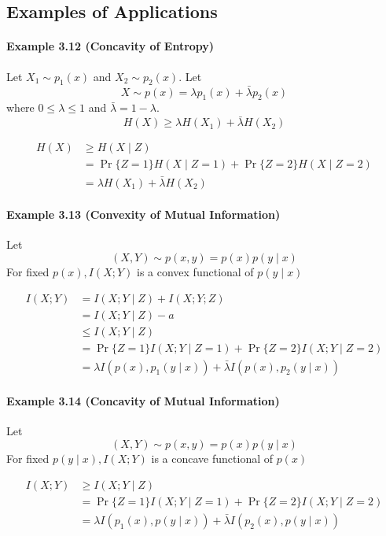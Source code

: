 \documentclass[8pt]{article}
\begin{document}
\subsection{Examples of Applications}
\begin{tcolorbox}
\paragraph{Example 3.12 (Concavity of Entropy)} Let $X_{1} \sim p_{1}(x)$ and $X_{2} \sim p_{2}(x)$. Let
$$
X \sim p(x)=\lambda p_{1}(x)+\bar{\lambda} p_{2}(x)
$$
where $0 \leq \lambda \leq 1$ and $\bar{\lambda}=1-\lambda .$
$$
H(X) \geq \lambda H\left(X_{1}\right)+\bar{\lambda} H\left(X_{2}\right)
$$
\end{tcolorbox}
$$
\begin{aligned}
H(X) & \geq H(X \mid Z) \\
&=\operatorname{Pr}\{Z=1\} H(X \mid Z=1)+\operatorname{Pr}\{Z=2\} H(X \mid Z=2) \\
&=\lambda H\left(X_{1}\right)+\bar{\lambda} H\left(X_{2}\right)
\end{aligned}
$$
\begin{tcolorbox}
\paragraph{Example 3.13 (Convexity of Mutual Information)} Let
$$
(X, Y) \sim p(x, y)=p(x) p(y \mid x)
$$
For fixed $p(x), I(X ; Y)$ is a convex functional of $p(y \mid x)$
\end{tcolorbox}
$$
\begin{aligned}
I(X ; Y) &=I(X ; Y \mid Z)+I(X ; Y ; Z) \\
&=I(X ; Y \mid Z)-a \\
& \leq I(X ; Y \mid Z) \\
&=\operatorname{Pr}\{Z=1\} I(X ; Y \mid Z=1)+\operatorname{Pr}\{Z=2\} I(X ; Y \mid Z=2) \\
&=\lambda I\left(p(x), p_{1}(y \mid x)\right)+\bar{\lambda} I\left(p(x), p_{2}(y \mid x)\right)
\end{aligned}
$$
\begin{tcolorbox}
\paragraph{Example 3.14 (Concavity of Mutual Information)} Let
$$
(X, Y) \sim p(x, y)=p(x) p(y \mid x)
$$
For fixed $p(y \mid x), I(X ; Y)$ is a concave functional of $p(x)$
\end{tcolorbox}
$$
\begin{aligned}
I(X ; Y) & \geq I(X ; Y \mid Z) \\
&=\operatorname{Pr}\{Z=1\} I(X ; Y \mid Z=1)+\operatorname{Pr}\{Z=2\} I(X ; Y \mid Z=2) \\
&=\lambda I\left(p_{1}(x), p(y \mid x)\right)+\bar{\lambda} I\left(p_{2}(x), p(y \mid x)\right)
\end{aligned}
$$
\end{document}
